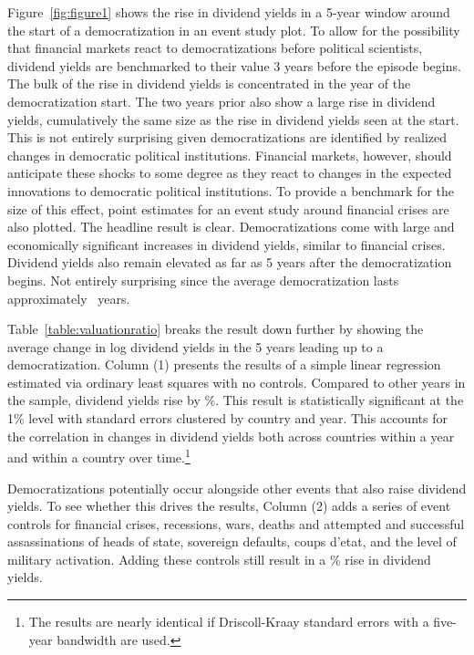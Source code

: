 

Figure~\ref{fig:figure1} shows the rise in dividend yields in a 5-year window around the start of a democratization in an event study plot. To allow for the possibility that financial markets react to democratizations before political scientists, dividend yields are benchmarked to their value 3 years before the episode begins. The bulk of the rise in dividend yields is concentrated in the year of the democratization start. The two years prior also show a large rise in dividend yields, cumulatively the same size as the rise in dividend yields seen at the start.  This is not entirely surprising given democratizations are identified by realized changes in democratic political institutions. Financial markets, however, should anticipate these shocks to some degree as they react to changes in the expected innovations to democratic political institutions. To provide a benchmark for the size of this effect, point estimates for an event study around financial crises are also plotted.  The headline result is clear. Democratizations come with large and economically significant increases in dividend yields, similar to financial crises.  Dividend yields also remain elevated as far as 5 years after the democratization begins. Not entirely surprising since the average democratization lasts approximately \avgDemEpisodeLengthInt\ years.

Table~\ref{table:valuationratio} breaks the result down further by showing the average change in log dividend yields in the 5 years leading up to a democratization. Column (1) presents the results of a simple linear regression estimated via ordinary least squares with no controls. Compared to other years in the sample, dividend yields rise by \tabOnecolOnePE\%.  This result is statistically significant at the 1\% level with standard errors clustered by country and year. This accounts for the correlation in changes in dividend yields both across countries within a year and within a country over time.\footnote{The results are nearly identical if Driscoll-Kraay standard errors with a five-year bandwidth are used.}

Democratizations potentially occur alongside other events that also raise dividend yields. To see whether this drives the results, Column (2) adds a series of event controls for financial crises, recessions, wars, deaths and attempted and successful assassinations of heads of state, sovereign defaults, coups d'etat, and the level of military activation. Adding these controls still result in a \tabOnecolTwoPE\% rise in dividend yields.

